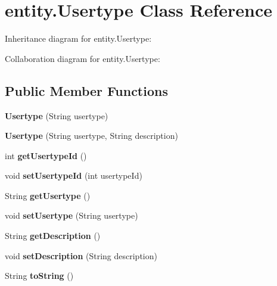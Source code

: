 \hypertarget{classentity_1_1_usertype}{}\section{entity.\+Usertype Class Reference}
\label{classentity_1_1_usertype}


Inheritance diagram for entity.\+Usertype\+:


Collaboration diagram for entity.\+Usertype\+:
\subsection*{Public Member Functions}
\begin{DoxyCompactItemize}
\item 
\mbox{\label{classentity_1_1_usertype_a3f17f72e004920b8d0099586a5b016fe}} 
{\bfseries Usertype} (String usertype)
\item 
\mbox{\label{classentity_1_1_usertype_aa9776ce9c7de7443a232c0531d78ea8b}} 
{\bfseries Usertype} (String usertype, String description)
\item 
\mbox{\label{classentity_1_1_usertype_a361cfd2f23d71f1ec7e69aa55e5f013c}} 
int {\bfseries get\+Usertype\+Id} ()
\item 
\mbox{\label{classentity_1_1_usertype_ad05f418dbd08027c7afac5e4af7d2254}} 
void {\bfseries set\+Usertype\+Id} (int usertype\+Id)
\item 
\mbox{\label{classentity_1_1_usertype_ad300a2783e57d8690d9db0c3b464737b}} 
String {\bfseries get\+Usertype} ()
\item 
\mbox{\label{classentity_1_1_usertype_ac4220b848c369fd726b0c8bebc8dbcf3}} 
void {\bfseries set\+Usertype} (String usertype)
\item 
\mbox{\label{classentity_1_1_usertype_a1699b78e303deb9b70224bf863b08063}} 
String {\bfseries get\+Description} ()
\item 
\mbox{\label{classentity_1_1_usertype_ab274da7bcfaa15606599fc856b958d24}} 
void {\bfseries set\+Description} (String description)
\item 
\mbox{\label{classentity_1_1_usertype_a4211735d5a357a4dbd778c1b1aa4b7e0}} 
String {\bfseries to\+String} ()
\end{DoxyCompactItemize}


